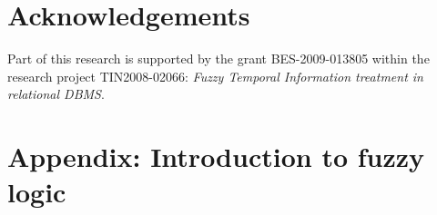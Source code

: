 \documentclass[graybox]{svmult}
\begin{document}
\section*{Acknowledgements}
Part of this research is supported by the grant BES-2009-013805 within the research project TIN2008-02066: \emph{Fuzzy Temporal Information treatment in relational DBMS}.



\def\JPicScale{0.5}


\newpage
\section*{Appendix: Introduction to fuzzy logic}
\label{app:fuzzy-logic}

\end{document}
